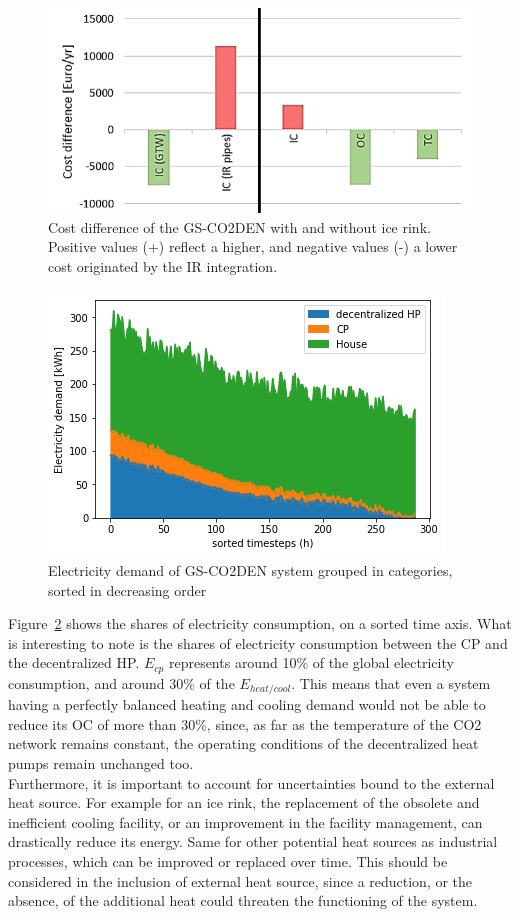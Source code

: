 \documentclass{article}
\begin{document}
\begin{figure}[tph]
	\centering
	\includegraphics[width=0.7\linewidth]{Images/V_IR_cost}
	\caption{Cost difference of the GS-CO2DEN with and without ice rink. Positive values (+) reflect a higher, and negative values (-) a lower cost originated by the IR integration.}
	\label{fig:V_IR_cost}
\end{figure}


\begin{figure}[tph]
	\centering
	\includegraphics[width=0.5\linewidth]{Images/V_CO2_eldem_sorted}
	\caption{Electricity demand of GS-CO2DEN system grouped in categories, sorted in decreasing order}
	\label{fig:gsco2_el}
\end{figure}

Figure~\ref{fig:gsco2_el} shows the shares of electricity consumption, on a sorted time axis. What is interesting to note is the shares of electricity consumption between the CP and the decentralized HP. $E_{cp}$ represents around 10\% of the global electricity consumption, and around 30\% of the $E_{heat/cool}$. This means that even a system having a perfectly balanced heating and cooling demand would not be able to reduce its OC of more than 30\%, since, as far as the temperature of the CO2 network remains constant, the operating conditions of the decentralized heat pumps remain unchanged too.\\

Furthermore, it is important to account for uncertainties bound to the external heat source. For example for an ice rink, the replacement of the obsolete and inefficient cooling facility, or an improvement in the facility management, can drastically reduce its energy. Same for other potential heat sources as industrial processes, which can be improved or replaced over time. This should be considered in the inclusion of external heat source, since a reduction, or the absence, of the additional heat could threaten the functioning of the system.
\end{document}
